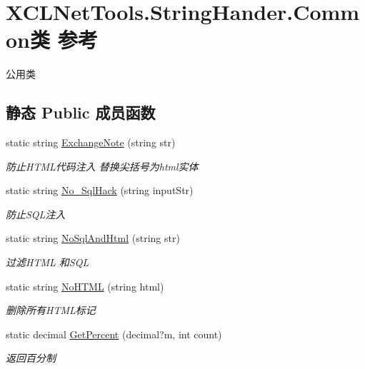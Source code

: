 \hypertarget{class_x_c_l_net_tools_1_1_string_hander_1_1_common}{}\section{X\+C\+L\+Net\+Tools.\+String\+Hander.\+Common类 参考}
\label{class_x_c_l_net_tools_1_1_string_hander_1_1_common}


公用类  


\subsection*{静态 Public 成员函数}
\begin{DoxyCompactItemize}
\item 
static string \hyperlink{class_x_c_l_net_tools_1_1_string_hander_1_1_common_af6ad14eae24704cda11cc498849d9737}{Exchange\+Note} (string str)
\begin{DoxyCompactList}\small\item\em 防止\+H\+T\+M\+L代码注入 替换尖括号为html实体 \end{DoxyCompactList}\item 
static string \hyperlink{class_x_c_l_net_tools_1_1_string_hander_1_1_common_accef3263e7a42ba85bc76477e95f42f9}{No\+\_\+\+Sql\+Hack} (string input\+Str)
\begin{DoxyCompactList}\small\item\em 防止\+S\+Q\+L注入 \end{DoxyCompactList}\item 
static string \hyperlink{class_x_c_l_net_tools_1_1_string_hander_1_1_common_a67d87071f6b40c184fd81a6f2e5e923e}{No\+Sql\+And\+Html} (string str)
\begin{DoxyCompactList}\small\item\em 过滤\+H\+T\+ML 和\+S\+QL \end{DoxyCompactList}\item 
static string \hyperlink{class_x_c_l_net_tools_1_1_string_hander_1_1_common_a7879e3cc9494f80e00f989cec68122e7}{No\+H\+T\+ML} (string html)
\begin{DoxyCompactList}\small\item\em 删除所有\+H\+T\+M\+L标记 \end{DoxyCompactList}\item 
static decimal \hyperlink{class_x_c_l_net_tools_1_1_string_hander_1_1_common_aeb6c0ff6a876aa51db57e41700becc5c}{Get\+Percent} (decimal?m, int count)
\begin{DoxyCompactList}\small\item\em 返回百分制 \end{DoxyCompactList}\item 

\end{DoxyCompactItemize}
